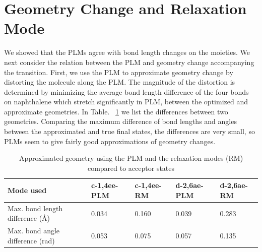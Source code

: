 \section{Geometry Change and Relaxation Mode}

We showed that the PLMs agree with bond length changes on the moieties.   We next
consider the relation between the PLM and geometry change accompanying the transition.
First, we use the PLM to approximate geometry change by distorting the molecule
along the PLM.   The magnitude of the distortion
 is determined  by minimizing the average bond length difference of the four bonds on naphthalene
 which stretch significantly in PLM, between the optimized and approximate geometries. In Table. ~\ref{aprroxGeom} we list the differences between two geometries.
Comparing the maximum difference of bond
lengths and angles between the approximated and true final states, the differences are very small,
so PLMs seem to give fairly good approximations of geometry changes.



\begin{table}[t]
 \caption{Approximated geometry using the PLM and the relaxation modes (RM) compared to acceptor states}
 \label{aprroxGeom}
 \begin{tabular}{lllll}
   \hline
   Mode used & c-1,4ee-PLM   & c-1,4ee-RM  & d-2,6ae-PLM  & d-2,6ae-RM\\
   \hline
   Max. bond length difference (\AA)   & 0.034 & 0.160 &0.039 & 0.283   \\
     Max. bond angle difference (rad)   & 0.053 &0.075 & 0.057 &0.135   \\
   \hline
 \end{tabular}
\end{table}


